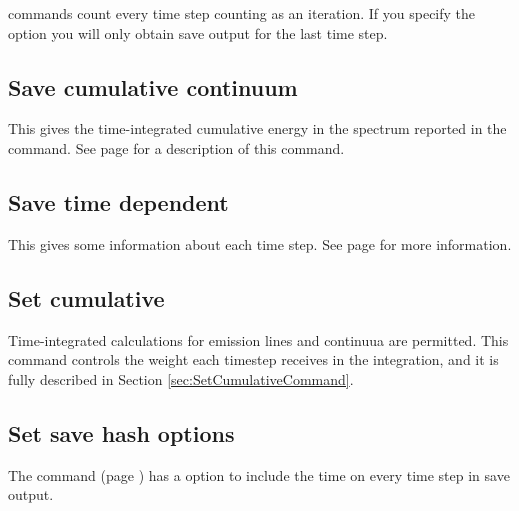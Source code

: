  commands count every time step
counting as an iteration.
If you specify the  option you will only
obtain save output for the last time step.

\subsection{Save cumulative continuum}

This gives the time-integrated cumulative energy in the
spectrum reported in the  command.
See page \pageref{sec:CommandSaveCumulativeContinuum} for a
description of this command.

\subsection{Save time dependent}

This gives some information about each time step.
See page \pageref{sec:SaveTimeDependent} for more
information.

\subsection{Set cumulative}

Time-integrated calculations for emission lines and continuua are permitted.
This command controls the weight each timestep receives in the integration,
and it is fully described in Section \ref{sec:SetCumulativeCommand}.

\subsection{Set save hash options}

The  command
(page \pageref{sec:CommandSetSaveHash})
has a  option to
include the time on every time step in save output. 
